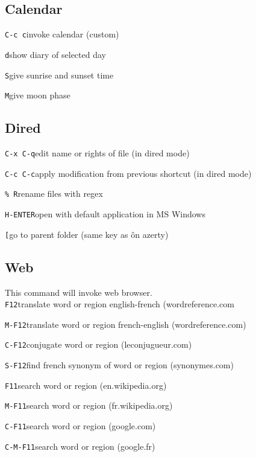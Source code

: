 \documentclass[10pt,landscape]{article}
\def\cm#1#2{{\tt#1}\dotfill#2\par}
\begin{document}
\begin{multicols}{3}
\subsection{Calendar}
\cm{C-c c}{invoke calendar (custom)}
\cm{d}{show diary of selected day}
\cm{S}{give sunrise and sunset time}
\cm{M}{give moon phase}

\subsection{Dired}
\cm{C-x C-q}{edit name or rights of file (in dired mode)}
\cm{C-c C-c}{apply modification from previous shortcut (in dired mode)}
\cm{\% R}{rename files with regex}
\cm{H-ENTER}{open with default application in MS Windows}
\cm{[}{go to parent folder (same key as \^ on azerty)}

\subsection{Web}
This command will invoke web browser.\\
\cm{F12}{translate word or region english-french (wordreference.com}
\cm{M-F12}{translate word or region french-english (wordreference.com)}
\cm{C-F12}{conjugate word or region (leconjugueur.com)}
\cm{S-F12}{find french synonym of word or region (synonymes.com)}
\cm{F11}{search word or region (en.wikipedia.org)}
\cm{M-F11}{search word or region (fr.wikipedia.org)}
\cm{C-F11}{search word or region (google.com)}
\cm{C-M-F11}{search word or region (google.fr)}




\end{multicols}
\end{document}
